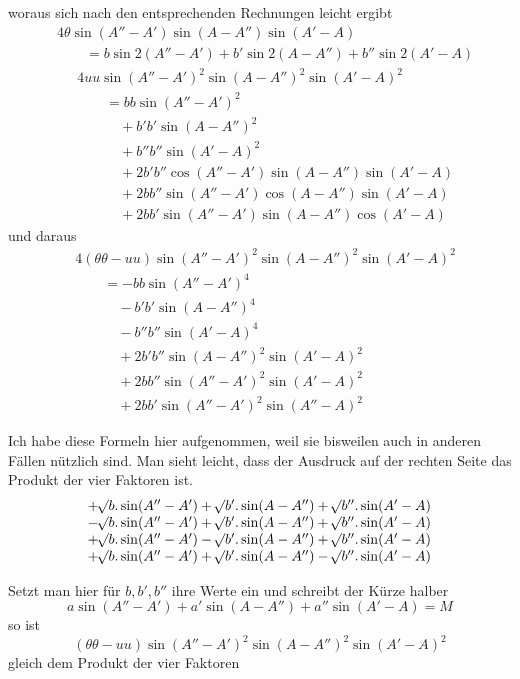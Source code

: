 %
woraus sich nach den entsprechenden Rechnungen leicht ergibt
\[
\begin{aligned}
&4\theta\sin(A''-A')\sin(A-A'')\sin(A'-A)\\
&\qquad=b\sin2(A''-A')+b'\sin2(A-A'')+b''\sin2(A'-A)
\end{aligned}
\]
\[
\begin{aligned}
&4uu\sin(A''-A')^2\sin(A-A'')^2\sin(A'-A)^2\\
&\qquad=bb\sin(A''-A')^2\\
&\qquad\quad+b'b'\sin(A-A'')^2\\
&\qquad\quad+b''b''\sin(A'-A)^2\\
&\qquad\quad+2b'b''\cos(A''-A')\sin(A-A'')\sin(A'-A)\\
&\qquad\quad+2bb''\sin(A''-A')\cos(A-A'')\sin(A'-A)\\
&\qquad\quad+2bb'\sin(A''-A')\sin(A-A'')\cos(A'-A)
\end{aligned}
\]
und daraus
\[
\begin{aligned}
&4(\theta\theta-uu)\sin(A''-A')^2\sin(A-A'')^2\sin(A'-A)^2\\
&\qquad=-bb\sin(A''-A')^4\\
&\qquad\quad-b'b'\sin(A-A'')^4\\
&\qquad\quad-b''b''\sin(A'-A)^4\\
&\qquad\quad+2b'b''\sin(A-A'')^2\sin(A'-A)^2\\
&\qquad\quad+2bb''\sin(A''-A')^2\sin(A'-A)^2\\
&\qquad\quad+2bb'\sin(A''-A')^2\sin(A''-A)^2
\end{aligned}
\]
\par
Ich habe diese Formeln hier aufgenommen, weil sie bisweilen auch in anderen Fällen nützlich sind. Man sieht leicht, dass der Ausdruck auf der rechten Seite das Produkt der vier Faktoren ist.
\[
\begin{array}{l}
+\BareRoot{b}.\sin(A''-A')+\BareRoot{b'}.\sin(A-A'')+\BareRoot{b''}.\sin(A'-A)\\
-\BareRoot{b}.\sin(A''-A')+\BareRoot{b'}.\sin(A-A'')+\BareRoot{b''}.\sin(A'-A)\\
+\BareRoot{b}.\sin(A''-A')-\BareRoot{b'}.\sin(A-A'')+\BareRoot{b''}.\sin(A'-A)\\
+\BareRoot{b}.\sin(A''-A')+\BareRoot{b'}.\sin(A-A'')-\BareRoot{b''}.\sin(A'-A)
\end{array}
\]
\par
Setzt man hier für \(b,b',b''\) ihre Werte ein und schreibt der Kürze halber
\[
a\sin(A''-A')+a'\sin(A-A'')+a''\sin(A'-A)=M
\]
so ist
\[
(\theta\theta-uu)\sin(A''-A')^2\sin(A-A'')^2\sin(A'-A)^2
\]
gleich dem Produkt der vier Faktoren
